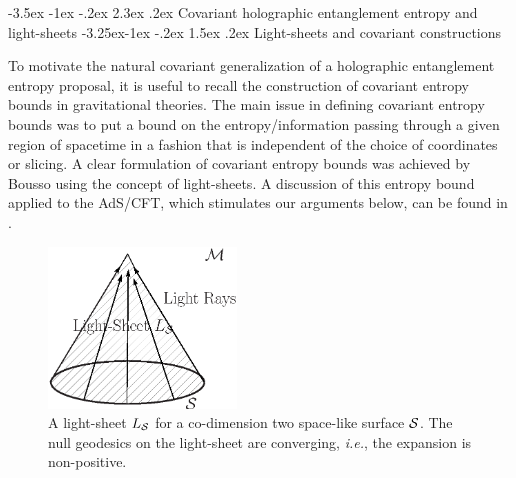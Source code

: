 \documentclass[12pt]{article}
\makeatletter
\renewcommand\section{\@startsection {section}{1}{\z@}%
                                   {-3.5ex \@plus -1ex \@minus -.2ex}%
                                   {2.3ex \@plus.2ex}%
                                   {\normalfont\large\bfseries}}
\renewcommand\subsection{\@startsection{subsection}{2}{\z@}%
                                     {-3.25ex\@plus -1ex \@minus -.2ex}%
                                     {1.5ex \@plus .2ex}%
                                     {\normalfont\bfseries}}
\def\ie{{\it i.e.}}
\makeatother
\begin{document}
\section{Covariant holographic entanglement entropy and light-sheets}
\label{cholols}
\subsection{Light-sheets and covariant constructions}
\label{lsmotive}

To motivate the natural covariant generalization of a holographic entanglement
 entropy proposal, it is useful to recall the construction of covariant
  entropy bounds in gravitational theories. The main issue in defining covariant entropy bounds
  was to put a bound on the entropy/information passing
   through a given region of spacetime in a fashion that is independent
    of the choice of coordinates or slicing. A clear formulation of
    covariant entropy bounds was achieved by Bousso
     \cite{Bousso:1999xy, Bousso:1999cb, Bousso:2002ju} using the concept of
     light-sheets.
     A discussion of this entropy bound applied to the AdS/CFT,
     which stimulates our arguments below, can be found in \cite{Bousso:2001cf}.


\begin{figure}[htbp]
\begin{center}
\includegraphics[width=5cm]{bousso}
\caption{A light-sheet $L_{{\cal S}}$ for a co-dimension two
space-like surface ${\cal S}$. The null geodesics on the light-sheet
are converging, \ie, the expansion is non-positive. }
\label{boussofig}
\end{center}
\end{figure}
\end{document}
